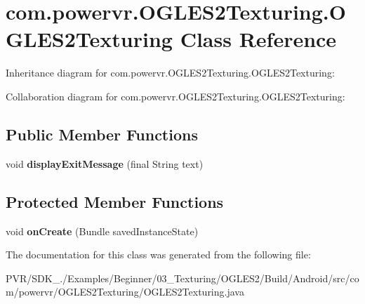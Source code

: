 \hypertarget{classcom_1_1powervr_1_1_o_g_l_e_s2_texturing_1_1_o_g_l_e_s2_texturing}{\section{com.\+powervr.\+O\+G\+L\+E\+S2\+Texturing.\+O\+G\+L\+E\+S2\+Texturing Class Reference}
\label{classcom_1_1powervr_1_1_o_g_l_e_s2_texturing_1_1_o_g_l_e_s2_texturing}
}


Inheritance diagram for com.\+powervr.\+O\+G\+L\+E\+S2\+Texturing.\+O\+G\+L\+E\+S2\+Texturing\+:


Collaboration diagram for com.\+powervr.\+O\+G\+L\+E\+S2\+Texturing.\+O\+G\+L\+E\+S2\+Texturing\+:
\subsection*{Public Member Functions}
\begin{DoxyCompactItemize}
\item 
\hypertarget{classcom_1_1powervr_1_1_o_g_l_e_s2_texturing_1_1_o_g_l_e_s2_texturing_a7a0f826af9e7fb80273224b59ed96b2e}{void {\bfseries display\+Exit\+Message} (final String text)}\label{classcom_1_1powervr_1_1_o_g_l_e_s2_texturing_1_1_o_g_l_e_s2_texturing_a7a0f826af9e7fb80273224b59ed96b2e}

\end{DoxyCompactItemize}
\subsection*{Protected Member Functions}
\begin{DoxyCompactItemize}
\item 
\hypertarget{classcom_1_1powervr_1_1_o_g_l_e_s2_texturing_1_1_o_g_l_e_s2_texturing_a7a211f78be862784fc416e5fcda7f6fb}{void {\bfseries on\+Create} (Bundle saved\+Instance\+State)}\label{classcom_1_1powervr_1_1_o_g_l_e_s2_texturing_1_1_o_g_l_e_s2_texturing_a7a211f78be862784fc416e5fcda7f6fb}

\end{DoxyCompactItemize}


The documentation for this class was generated from the following file\+:\begin{DoxyCompactItemize}
\item 
P\+V\+R/\+S\+D\+K\+\_./\+Examples/\+Beginner/03\+\_\+\+Texturing/\+O\+G\+L\+E\+S2/\+Build/\+Android/src/com/powervr/\+O\+G\+L\+E\+S2\+Texturing/O\+G\+L\+E\+S2\+Texturing.\+java\end{DoxyCompactItemize}
